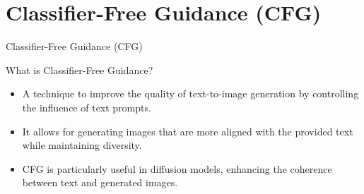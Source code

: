 \section{Classifier-Free Guidance (CFG)}
\begin{frame}{}
    \LARGE Classifier-Free Guidance (CFG)
\end{frame}

\begin{frame}{What is Classifier-Free Guidance?}
    \begin{itemize}
        \item A technique to improve the quality of text-to-image generation by controlling the influence of text prompts.
        \item It allows for generating images that are more aligned with the provided text while maintaining diversity.
        \item CFG is particularly useful in diffusion models, enhancing the coherence between text and generated images.
    \end{itemize}
\end{frame}

